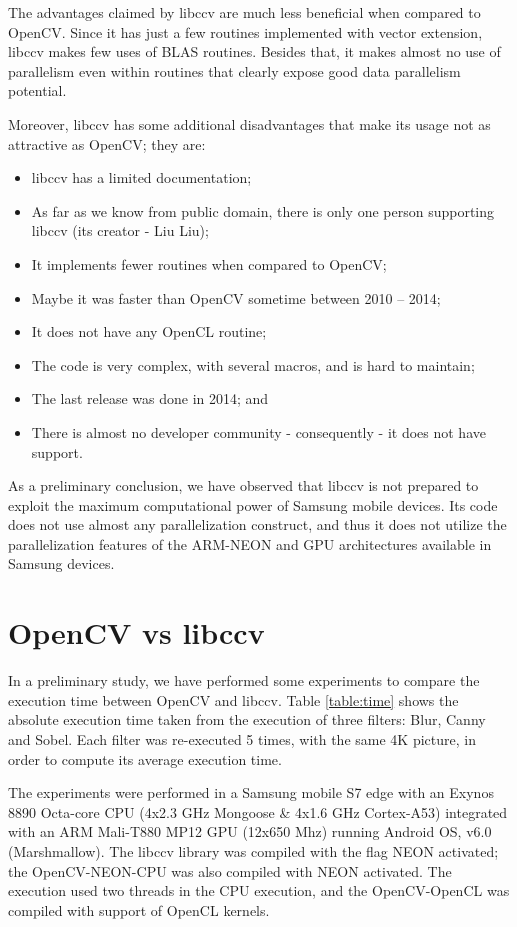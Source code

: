\documentclass[12pt, fleqn]{article}
\begin{document}
The advantages claimed by libccv are much less beneficial when compared to OpenCV. Since it has just a few routines implemented with vector extension, libccv makes few uses of BLAS routines.  Besides that, it makes almost no  use of parallelism even within routines that  clearly expose good data parallelism potential.

Moreover, libccv has some additional disadvantages that make its usage not as attractive as OpenCV; they are:

\begin{itemize}
	\item libccv has a limited documentation;
	\item As far as we know from public domain, there is only one person supporting libccv (its creator -  Liu Liu);
	\item It implements fewer routines  when compared to OpenCV;
	\item Maybe it was faster than OpenCV sometime between 2010 -- 2014;
	\item It does not have any OpenCL routine;
	\item The code is very complex, with several macros, and is hard to maintain;
	\item The last release was done in 2014; and
	\item There is almost no developer community - consequently - it does not have support.
\end{itemize}

As a preliminary conclusion, we have observed that  libccv is not prepared to exploit the maximum computational power of Samsung mobile devices. Its  code does  not  use almost any parallelization construct,  and thus it does not utilize the parallelization features of the ARM-NEON  and  GPU architectures available in Samsung devices.

\section{OpenCV vs libccv}
\label{sec:libfight}
In a preliminary study, we  have performed some experiments to compare the execution time between OpenCV and libccv. Table \ref{table:time} shows the absolute execution time taken from the execution of three filters: Blur, Canny and Sobel. Each filter was re-executed 5 times, with the same 4K picture, in order to compute its  average execution time.

The experiments were performed in a Samsung mobile S7 edge with an Exynos 8890 Octa-core CPU (4x2.3 GHz Mongoose \& 4x1.6 GHz Cortex-A53) integrated with an ARM Mali-T880 MP12 GPU (12x650 Mhz) running Android OS, v6.0 (Marshmallow). The libccv library was compiled with the flag NEON activated; the OpenCV-NEON-CPU  was also compiled with NEON activated. The  execution used  two threads in the CPU execution, and the OpenCV-OpenCL was compiled with support of OpenCL kernels.
\end{document}
